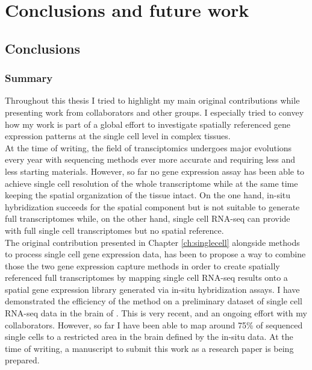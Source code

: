 \chapter{Conclusions and future work}\label{ch:conclusions}

\section{Conclusions}

	\subsection{Summary}
	
Throughout this thesis I tried to highlight my main original contributions while presenting work from collaborators and other groups. I especially tried to convey how my work is part of a global effort to investigate spatially referenced gene expression patterns at the single cell level in complex tissues.\\

At the time of writing, the field of transciptomics undergoes major evolutions every year with sequencing methods ever more accurate and requiring less and less starting materials. However, so far no gene expression assay has been able to achieve single cell resolution of the whole transcriptome while at the same time keeping the spatial organization of the tissue intact. On the one hand, in-situ hybridization succeeds for the spatial component but is not suitable to generate full transcriptomes while, on the other hand, single cell RNA-seq can provide with full single cell transcriptomes but no spatial reference.\\

The original contribution presented in Chapter \ref{ch:singlecell} alongside methods to process single cell gene expression data, has been to propose a way to combine those the two gene expression capture methods in order to create spatially referenced full transcriptomes by mapping single cell RNA-seq results onto a spatial gene expression library generated via in-situ hybridization assays. I have demonstrated the efficiency of the method on a preliminary dataset of single cell RNA-seq data in the brain of \platy{}. This is very recent, and an ongoing effort with my collaborators. However, so far I have been able to map around 75\% of sequenced single cells to a restricted area in the brain defined by the in-situ data. At the time of writing, a manuscript to submit this work as a research paper is being prepared.\\

